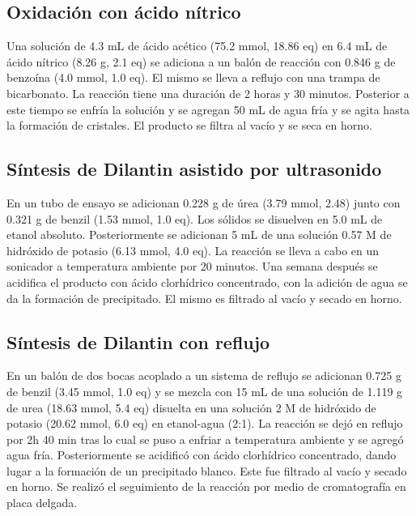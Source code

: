 \documentclass[fleqn,10pt]{SelfArx}
\begin{document}
\subsection{Oxidaci\'on con \'acido n\'itrico}
Una soluci\'on de 4.3 mL de \'acido ac\'etico (75.2 mmol, 18.86 eq) en 6.4 mL de \'acido n\'itrico (8.26 g, 2.1 eq) se adiciona a un bal\'on de reacci\'on con 0.846 g de benzo\'ina (4.0 mmol, 1.0 eq). El mismo se lleva a reflujo con una trampa de bicarbonato. La reacci\'on tiene una duraci\'on de 2 horas y 30 minutos. Posterior a este tiempo se enfr\'ia la soluci\'on y se agregan 50 mL de agua fr\'ia y se agita hasta la formaci\'on de cristales. El producto se filtra al vac\'io y se seca en horno.

\subsection{S\'intesis de Dilantin asistido por ultrasonido}
En un tubo de ensayo se adicionan 0.228 g de \'urea (3.79 mmol, 2.48) junto con 0.321 g de benzil (1.53 mmol, 1.0 eq). Los s\'olidos se disuelven en 5.0 mL de etanol absoluto. Posteriormente se adicionan 5 mL de una soluci\'on 0.57 M de hidr\'oxido de potasio (6.13 mmol, 4.0 eq). La reacci\'on se lleva a cabo en un sonicador a temperatura ambiente por 20 minutos. Una semana despu\'es se acidifica el producto con \'acido clorh\'idrico concentrado, con la adici\'on de agua se da la formaci\'on de precipitado. El mismo es filtrado al vac\'io y secado en horno. 

\subsection{S\'intesis de Dilantin con reflujo}
En un balón de dos bocas acoplado a un sistema de reflujo se adicionan 0.725 g de benzil (3.45 mmol, 1.0 eq) y se mezcla con 15 mL de una solución de 1.119 g de urea (18.63 mmol, 5.4 eq) disuelta en una solución 2 M de hidróxido de potasio (20.62 mmol, 6.0 eq) en etanol-agua (2:1). La reacción se dejó en reflujo por 2h 40 min tras lo cual se puso a enfriar a temperatura ambiente y se agregó agua fría. Posteriormente se acidificó con ácido clorhídrico concentrado, dando lugar a la formación de un precipitado blanco. Este fue filtrado al vacío y secado en horno. Se realizó el seguimiento de la reacción por medio de cromatografía en placa delgada.


\end{document}
